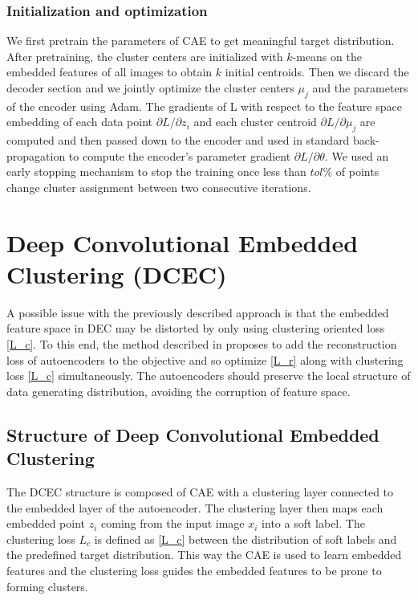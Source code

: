 \subsubsection{Initialization and optimization}

We first pretrain the parameters of CAE to get meaningful target distribution. After pretraining, the cluster centers are initialized with $k$-means on the embedded features of all images to obtain $k$ initial centroids. Then we discard the decoder section and we jointly optimize the cluster centers {$\mu_j$} and the parameters of the encoder using Adam. The gradients of L with respect to the feature space embedding of each data point $\partial L / \partial z_i$ and each cluster centroid $\partial L / \partial \mu_j$ are computed and then passed down to the encoder and used in standard back-propagation to compute the encoder's parameter gradient $\partial L / \partial \theta$. We used an early stopping mechanism to stop the training once less than $tol\%$ of points change cluster assignment between two consecutive iterations. 

\section{Deep Convolutional Embedded Clustering (DCEC)}

A possible issue with the previously described approach is that the embedded feature space in DEC may be distorted by only using clustering oriented loss \ref{L_c}. To this end, the method described in \cite{10.1007/978-3-319-70096-0_39} proposes to add the reconstruction loss of autoencoders to the objective and so optimize \ref{L_r} along with clustering loss \ref{L_c} simultaneously. The autoencoders should preserve the local structure of data generating distribution, avoiding the corruption of feature space.

\subsection{Structure of Deep Convolutional Embedded Clustering}

The DCEC structure is composed of CAE with a clustering layer connected to the embedded layer of the autoencoder. The clustering layer then maps each embedded point $z_i$ coming from the input image $x_i$ into a soft label. The clustering loss $L_c$ is defined as \ref{L_c} between the distribution of soft labels and the predefined target distribution. This way the CAE is used to learn embedded features and the clustering loss guides the embedded features to be prone to forming clusters. 

